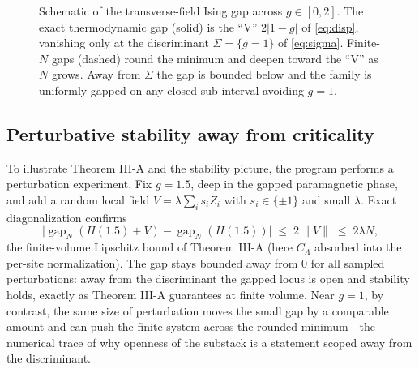 \documentclass[12pt]{article}
\newcommand{\Sig}{\Sigma}                       %
\newcommand{\norm}[1]{\lVert #1 \rVert}
\newcommand{\gapfin}[1]{\operatorname{gap}_{#1}}
\theoremstyle{plain}
\theoremstyle{definition}
\theoremstyle{remark}
\begin{document}
\begin{figure}[h]
\centering
{}
\caption{Schematic of the transverse-field Ising gap across $g\in[0,2]$. The exact
thermodynamic gap (solid) is the ``V'' $2\lvert 1-g\rvert$ of \eqref{eq:disp}, vanishing
only at the discriminant $\Sig=\{g=1\}$ of \eqref{eq:sigma}. Finite-$N$ gaps (dashed)
round the minimum and deepen toward the ``V'' as $N$ grows. Away from $\Sig$ the gap is
bounded below and the family is uniformly gapped on any closed sub-interval avoiding
$g=1$.}
\label{fig:gap}
\end{figure}

\subsection{Perturbative stability away from criticality}
\label{sec:numerics-pert}

To illustrate Theorem III-A and the stability picture, the program performs a
perturbation experiment. Fix $g=1.5$, deep in the gapped paramagnetic phase, and add a
random local field $V=\lambda\sum_i s_i Z_i$ with $s_i\in\{\pm 1\}$ and small
$\lambda$. Exact diagonalization confirms
\begin{equation}
\label{eq:lip-numeric}
\big\lvert\gapfin{N}(H(1.5)+V)-\gapfin{N}(H(1.5))\big\rvert\;\le\;2\,\norm{V}
\;\le\;2\lambda N,
\end{equation}
the finite-volume Lipschitz bound of Theorem III-A (here $C_\Lambda$ absorbed into the
per-site normalization). The gap stays bounded away from $0$ for all sampled
perturbations: away from the discriminant the gapped locus is open and stability holds,
exactly as Theorem III-A guarantees at finite volume. Near $g=1$, by contrast, the same
size of perturbation moves the small gap by a comparable amount and can push the finite
system across the rounded minimum---the numerical trace of why openness of the
substack is a statement scoped away from the discriminant.
\end{document}
